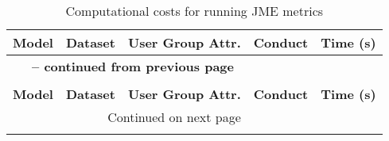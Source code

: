 \begin{center}
\begin{longtable}{|l|l|l|l|l|} 
\caption[Computational costs for running JME metrics]{Computational costs for running JME metrics} \\
\hline 
\multicolumn{1}{|c|}{\textbf{Model}} & \multicolumn{1}{c|}{\textbf{Dataset}} & \multicolumn{1}{c|}{\textbf{User Group Attr.}} & \multicolumn{1}{c|}{\textbf{Conduct}} & \multicolumn{1}{|c|}{\textbf{Time (s)}} \\ \hline
\endfirsthead

\multicolumn{3}{c}{{\bfseries \tablename\ \thetable{} -- continued from previous page}} \\ 
\multicolumn{3}{c}{} \\
\hline \multicolumn{1}{|c|}{\textbf{Model}} & \multicolumn{1}{c|}{\textbf{Dataset}} & \multicolumn{1}{c|}{\textbf{User Group Attr.}} & \multicolumn{1}{c|}{\textbf{Conduct}} & \multicolumn{1}{|c|}{\textbf{Time (s)}} \\ \hline
\endhead

\hline \multicolumn{3}{r}{{Continued on next page}} \\ 
\endfoot
\endlastfoot


\end{longtable}
\end{center}

